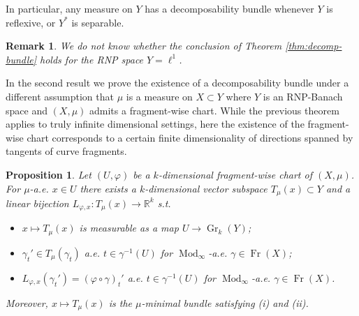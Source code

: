 \documentclass{amsart}
\newtheorem{corollary}[theorem]{Corollary}
\newtheorem{proposition}[theorem]{Proposition}
\newtheorem{remark}[theorem]{Remark}
\numberwithin{equation}{section}
\newcommand{\R}{\mathbb{R}}
\newcommand{\Mod}{\operatorname{Mod}}
\newcommand{\Fr}{\operatorname{Fr}}
\newcommand{\inv}{^{-1}}
\begin{document}
In particular, any measure on $Y$ has a decomposability bundle whenever $Y$ is reflexive, or $Y^*$ is separable.

\begin{remark}\label{rmk:dunno}
We do not know whether the conclusion of Theorem \ref{thm:decomp-bundle} holds for the RNP space $Y=\ell^1$.
\end{remark}

In the second result we prove the existence of a decomposability bundle under a different assumption that $\mu$ is a measure on $X\subset Y$ where $Y$ is an RNP-Banach space and $(X,\mu)$ admits a fragment-wise chart. While the previous theorem applies to truly infinite dimensional settings, here the existence of the fragment-wise chart corresponds to a certain finite dimensionality of directions spanned by tangents of curve fragments.

\begin{proposition}\label{prop:linear-part-of-blowup} 
Let $(U,\varphi)$ be a $k$-dimensional fragment-wise chart of $(X,\mu)$. For $\mu$-a.e. $x\in U$ there exists a $k$-dimensional vector subspace $T_\mu(x)\subset Y$ and a linear bijection $L_{\varphi,x}:T_\mu(x)\to \R^k$ s.t.
\begin{itemize}
	\item[(i)] $x\mapsto T_\mu(x)$ is measurable as a map $U\to \operatorname{Gr}_k(Y)$;
	\item[(ii)] $\gamma_t'\in T_\mu({\gamma_t})$ a.e. $t\in \gamma\inv(U)$ for $\Mod_\infty$-a.e. $\gamma\in \Fr(X)$;
	\item[(iii)] $L_{\varphi,x}(\gamma_t')=(\varphi\circ\gamma)_t'$ a.e. $t\in \gamma\inv(U)$ for $\Mod_\infty$-a.e. $\gamma\in \Fr(X)$.
\end{itemize}
Moreover, $x\mapsto T_\mu(x)$ is the $\mu$-minimal bundle satisfying (i) and (ii). 
\end{proposition}
\end{document}
